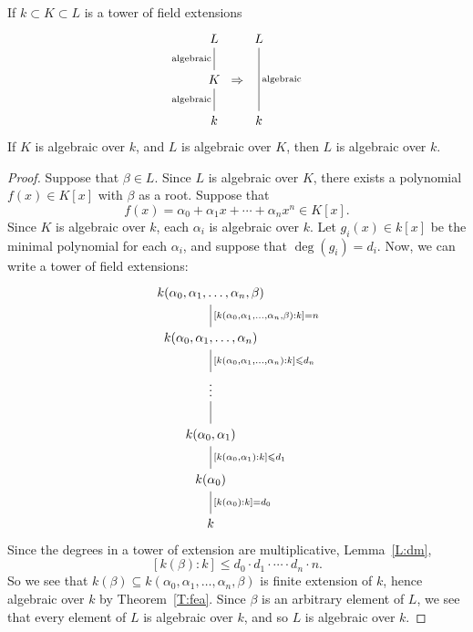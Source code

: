 \documentclass{ximera}
\begin{document}
\begin{corollary}\label{C:feac}
  If $k\subset K\subset L$ is a tower of field extensions
  \[
  \begin{tikzcd}[column sep=0pt]
    L\ar[d,-,"\text{algebraic}",swap] & & L\ar[dd,-,"\text{algebraic}"]\\
    K \ar[d,-,"\text{algebraic}",swap] & \Rightarrow& \\
    k & \vphantom{K} & k
  \end{tikzcd}
  \]
  If $K$ is algebraic over $k$, and $L$ is algebraic over $K$, then $L$
  is algebraic over $k$.
  \begin{proof}
    Suppose that $\beta\in L$. Since $L$ is algebraic over $K$, there
    exists a polynomial $f(x)\in K[x]$ with $\beta$ as a root. Suppose that
    \[
    f(x) = \alpha_0 + \alpha_1 x + \cdots + \alpha_n x^n \in K[x].
    \]
    Since $K$ is algebraic over $k$, each $\alpha_i$ is algebraic over
    $k$. Let $g_i(x)\in k[x]$ be the minimal polynomial for each
    $\alpha_i$, and suppose that $\deg(g_i) = d_i$. Now, we can write
    a tower of field extensions:
    \[
    \begin{tikzcd}
      k(\alpha_0,\alpha_1,\dots,\alpha_n,\beta) \ar[d,-, "{[k(\alpha_0,\alpha_1,\dots, \alpha_n,\beta):k] = n}"]\\
      k(\alpha_0,\alpha_1,\dots,\alpha_n) \ar[d,-, "{[k(\alpha_0,\alpha_1,\dots, \alpha_n):k] \le d_n}"]\\
      \vdots  \ar[d,-]\\
      k(\alpha_0,\alpha_1) \ar[d,-, "{[k(\alpha_0,\alpha_1):k] \le d_1}"]\\
      k(\alpha_0) \ar[d,-, "{[k(\alpha_0):k] =d_0}"]\\
      k
    \end{tikzcd}
    \]
    Since the degrees in a tower of extension are multiplicative,
    Lemma~\ref{L:dm},
    \[
    [k(\beta):k]\le d_0\cdot d_1 \cdot \cdots \cdot d_n \cdot n.
    \]
    So we see that $k(\beta)\subseteq
    k(\alpha_0,\alpha_1,\dots,\alpha_n,\beta)$ is finite extension of
    $k$, hence algebraic over $k$ by Theorem~\ref{T:fea}. Since $\beta$
    is an arbitrary element of $L$, we see that every element of $L$
    is algebraic over $k$, and so $L$ is algebraic over $k$.
  \end{proof}
\end{corollary}





\end{document}
